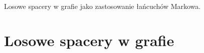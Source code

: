 {
\makeatletter
{}
\makeatother
\graphicspath{{../probabil}}

\begin{questiontext}
	Losowe spacery w grafie jako zastosowanie łańcuchów Markowa.
\end{questiontext}

\section{Losowe spacery w grafie}
 {
 }
}
